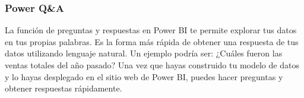 \subsubsection{Power Q\&A}
La función de preguntas y respuestas en Power BI te permite explorar tus datos en tus propias palabras. Es la forma más 
rápida de obtener una respuesta de tus datos utilizando lenguaje natural. Un ejemplo podría ser: ¿Cuáles fueron las ventas 
totales del año pasado? Una vez que hayas construido tu modelo de datos y lo hayas desplegado en el sitio web de Power BI, 
puedes hacer preguntas y obtener respuestas rápidamente. \cite{what_is_power_bi}
